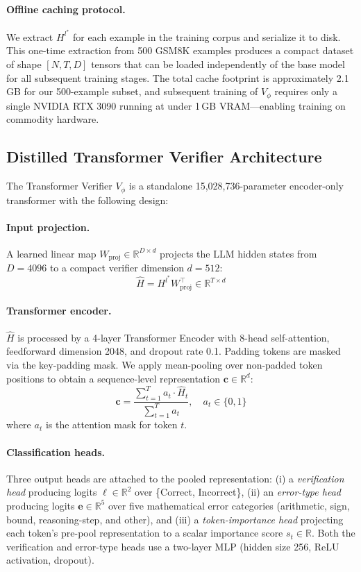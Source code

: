 \documentclass{article}
\begin{document}
\paragraph{Offline caching protocol.} We extract $H^{l^*}$ for each example in the training corpus and serialize it to disk. This one-time extraction from 500 GSM8K examples produces a compact dataset of shape $[N, T, D]$ tensors that can be loaded independently of the base model for all subsequent training stages. The total cache footprint is approximately 2.1\,GB for our 500-example subset, and subsequent training of $V_\phi$ requires only a single NVIDIA RTX 3090 running at under 1\,GB VRAM---enabling training on commodity hardware.

\subsection{Distilled Transformer Verifier Architecture}
\label{sec:architecture}

The Transformer Verifier $V_\phi$ is a standalone 15,028,736-parameter encoder-only transformer with the following design:

\paragraph{Input projection.} A learned linear map $W_{\text{proj}} \in \mathbb{R}^{D \times d}$ projects the LLM hidden states from $D = 4096$ to a compact verifier dimension $d = 512$:
\begin{equation}
  \hat{H} = H^{l^*} W_{\text{proj}}^\top \in \mathbb{R}^{T \times d}
\end{equation}

\paragraph{Transformer encoder.} $\hat{H}$ is processed by a 4-layer Transformer Encoder with 8-head self-attention, feedforward dimension 2048, and dropout rate 0.1. Padding tokens are masked via the key-padding mask. We apply mean-pooling over non-padded token positions to obtain a sequence-level representation $\mathbf{c} \in \mathbb{R}^{d}$:
\begin{equation}
  \mathbf{c} = \frac{\sum_{t=1}^{T} a_t \cdot \hat{H}_t}{\sum_{t=1}^{T} a_t}, \quad a_t \in \{0, 1\}
\end{equation}
where $a_t$ is the attention mask for token $t$.

\paragraph{Classification heads.} Three output heads are attached to the pooled representation: (i) a \emph{verification head} producing logits $\ell \in \mathbb{R}^2$ over \{Correct, Incorrect\}, (ii) an \emph{error-type head} producing logits $\mathbf{e} \in \mathbb{R}^5$ over five mathematical error categories (arithmetic, sign, bound, reasoning-step, and other), and (iii) a \emph{token-importance head} projecting each token's pre-pool representation to a scalar importance score $s_t \in \mathbb{R}$. Both the verification and error-type heads use a two-layer MLP (hidden size 256, ReLU activation, dropout).
\end{document}
